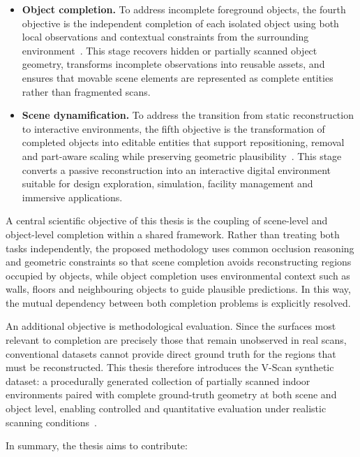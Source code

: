 \begin{itemize}
    \item \textbf{Object completion.} To address incomplete foreground objects, the fourth objective is the independent completion of each isolated object using both local observations and contextual constraints from the surrounding environment~\cite{mittal_autosdf_2022, vermandere_geometry_2025}. This stage recovers hidden or partially scanned object geometry, transforms incomplete observations into reusable assets, and ensures that movable scene elements are represented as complete entities rather than fragmented scans.

    \item \textbf{Scene dynamification.} To address the transition from static reconstruction to interactive environments, the fifth objective is the transformation of completed objects into editable entities that support repositioning, removal and part-aware scaling while preserving geometric plausibility~\cite{wei_approximate_2022, vermandere_adaptive_2026}. This stage converts a passive reconstruction into an interactive digital environment suitable for design exploration, simulation, facility management and immersive applications.
\end{itemize}

A central scientific objective of this thesis is the coupling of scene-level and object-level completion within a shared framework. Rather than treating both tasks independently, the proposed methodology uses common occlusion reasoning and geometric constraints so that scene completion avoids reconstructing regions occupied by objects, while object completion uses environmental context such as walls, floors and neighbouring objects to guide plausible predictions. In this way, the mutual dependency between both completion problems is explicitly resolved.

An additional objective is methodological evaluation. Since the surfaces most relevant to completion are precisely those that remain unobserved in real scans, conventional datasets cannot provide direct ground truth for the regions that must be reconstructed. This thesis therefore introduces the V-Scan synthetic dataset: a procedurally generated collection of partially scanned indoor environments paired with complete ground-truth geometry at both scene and object level, enabling controlled and quantitative evaluation under realistic scanning conditions~\cite{de_geyter_automated_2022, vermandere_synthetic_2026}.

In summary, the thesis aims to contribute:

